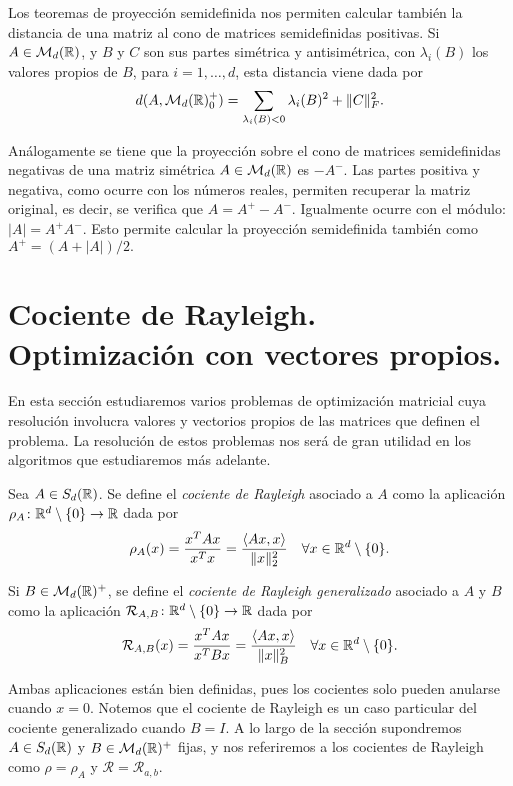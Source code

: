 \begin{remark}
    Los teoremas de proyección semidefinida nos permiten calcular también la distancia de una matriz al cono de matrices semidefinidas positivas. Si $A \in \mathcal{M}_d(\mathbb{R})$, y $B$ y $C$ son sus partes simétrica y antisimétrica, con $\lambda_i(B)$ los valores propios de $B$, para $i = 1,\dots,d$, esta distancia viene dada por
    \[ d(A,\mathcal{M}_d(\mathbb{R})^+_0) = \sum_{\lambda_i(B) < 0} \lambda_i(B)^2 + \|C\|^2_F.  \]
\end{remark}

\begin{remark}
    Análogamente se tiene que la proyección sobre el cono de matrices semidefinidas negativas de una matriz simétrica $A \in \mathcal{M}_d(\mathbb{R})$ es $-A^-$. Las partes positiva y negativa, como ocurre con los números reales, permiten recuperar la matriz original, es decir, se verifica que $A = A^+ - A^-$. Igualmente ocurre con el módulo: $|A| = A^+ A^-$. Esto permite calcular la proyección semidefinida también como $A^+ = (A + |A|)/2.$
\end{remark}

\section{Cociente de Rayleigh. Optimización con vectores propios.}

En esta sección estudiaremos varios problemas de optimización matricial cuya resolución involucra valores y vectorios propios de las matrices que definen el problema. La resolución de estos problemas nos será de gran utilidad en los algoritmos que estudiaremos más adelante.

\begin{definition}
    Sea $A \in S_d(\mathbb{R})$. Se define el \emph{cociente de Rayleigh} asociado a $A$ como la aplicación $\rho_A \colon \mathbb{R}^d \setminus \{0\} \to \mathbb{R}$ dada por
    \[ \rho_A(x) = \frac{x^TAx}{x^Tx} = \frac{\langle Ax, x\rangle}{\|x\|_2^2} \quad \forall x \in \mathbb{R}^d \setminus\{0\}. \]

    Si $B \in \mathcal{M}_d(\mathbb{R})^+$, se define el \emph{cociente de Rayleigh generalizado} asociado a $A$ y $B$ como la aplicación $\mathcal{R}_{A,B} \colon \mathbb{R}^d \setminus \{0\}\to \mathbb{R}$ dada por
    \[ \mathcal{R}_{A,B}(x) = \frac{x^TAx}{x^TBx} = \frac{\langle Ax ,x \rangle}{\|x\|_B^2} \quad \forall x \in \mathbb{R}^d \setminus \{0\}.\]
\end{definition}

Ambas aplicaciones están bien definidas, pues los cocientes solo pueden anularse cuando $x = 0$. Notemos que el cociente de Rayleigh es un caso particular del cociente generalizado cuando $B = I$. A lo largo de la sección supondremos $A \in S_d(\mathbb{R})$ y $B \in \mathcal{M}_d(\mathbb{R})^+$ fijas, y nos referiremos a los cocientes de Rayleigh como $\rho = \rho_A$ y $\mathcal{R} = \mathcal{R}_{a,b}$.

